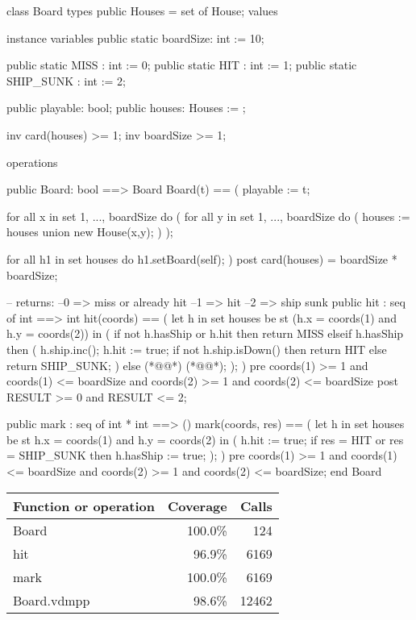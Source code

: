 \begin{vdm_al}
class Board
 types
  public Houses = set of House;
 values
 
 instance variables
  public static boardSize: int := 10;
  
  public static MISS : int := 0;
  public static HIT : int := 1;
  public static SHIP_SUNK : int := 2;
  
  public playable: bool;
  public houses: Houses := {};
  
  inv card(houses) >= 1;
  inv boardSize >= 1;
  
 operations
 
  public Board: bool ==> Board
   Board(t) == 
   (
    playable := t;
    
    for all x in set {1, ..., boardSize}  do (
     for all y in set {1, ..., boardSize} do (
      houses := houses union {new House(x,y)};
     )
    );
    
    for all h1 in set houses do h1.setBoard(self);
   )
  post card(houses) = boardSize * boardSize;
  
  -- returns:
  --0 => miss or already hit
  --1 => hit
  --2 => ship sunk
  public hit : seq of int ==> int
   hit(coords) ==
   (
    let h in set houses be st (h.x = coords(1) and h.y = coords(2)) in (
     if not h.hasShip or h.hit then return MISS
     elseif h.hasShip then
      (
       h.ship.inc();
       h.hit := true;
       if not h.ship.isDown() then return HIT
       else return SHIP_SUNK;
      )
     else (*@@*) (*@@*);
    );
   )
   pre coords(1) >= 1 and coords(1) <= boardSize and coords(2) >= 1 and coords(2) <= boardSize      
   post RESULT >= 0 and RESULT <= 2;

  public mark : seq of int * int ==> ()
   mark(coords, res) ==
   (
    let h in set houses be st h.x = coords(1) and h.y = coords(2) in (
     h.hit := true;
     if res = HIT or res = SHIP_SUNK then
      h.hasShip := true;
    );
   )
   pre coords(1) >= 1 and coords(1) <= boardSize and coords(2) >= 1 and coords(2) <= boardSize;       
end Board
\end{vdm_al}
\bigskip
\begin{longtable}{|l|r|r|}
\hline
Function or operation & Coverage & Calls \\
\hline
\hline
Board & 100.0\% & 124 \\
\hline
hit & 96.9\% & 6169 \\
\hline
mark & 100.0\% & 6169 \\
\hline
\hline
Board.vdmpp & 98.6\% & 12462 \\
\hline
\end{longtable}

